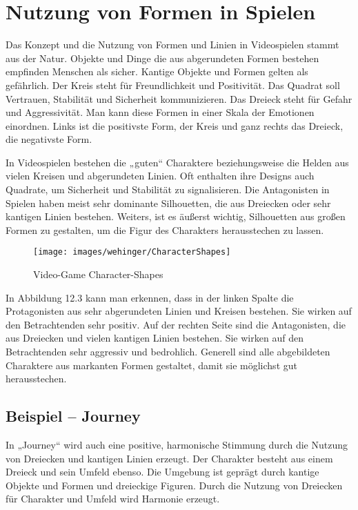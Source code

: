 \section{Nutzung von Formen in Spielen}
Das Konzept und die Nutzung von Formen und Linien in Videospielen stammt aus der Natur. Objekte und Dinge die aus abgerundeten Formen bestehen empfinden Menschen als sicher. Kantige Objekte und Formen gelten als gefährlich. Der Kreis steht für Freundlichkeit und Positivität. Das Quadrat soll Vertrauen, Stabilität und Sicherheit kommunizieren. Das Dreieck steht für Gefahr und Aggressivität. Man kann diese Formen in einer Skala der Emotionen einordnen. Links ist die positivste Form, der Kreis und ganz rechts das Dreieck, die negativste Form. 
\cite{_drawing_basics_and_video_game_art}

In Videospielen bestehen die „guten“ Charaktere beziehungsweise die Helden aus vielen Kreisen und abgerundeten Linien. Oft enthalten ihre Designs auch Quadrate, um Sicherheit und Stabilität zu signalisieren. Die Antagonisten in Spielen haben meist sehr dominante Silhouetten, die aus Dreiecken oder sehr kantigen Linien bestehen. Weiters, ist es äußerst wichtig, Silhouetten aus großen Formen zu gestalten, um die Figur des Charakters herausstechen zu lassen.
\cite{_drawing_basics_and_video_game_art}

\begin{figure}[H]
	\centering
	\texttt{[image: images/wehinger/CharacterShapes]}
	\caption{Video-Game Character-Shapes\cite{_drawing_basics_and_video_game_art}}
\end{figure}

In Abbildung 12.3 kann man erkennen, dass in der linken Spalte die Protagonisten aus sehr abgerundeten Linien und Kreisen bestehen. Sie wirken auf den Betrachtenden sehr positiv. Auf der rechten Seite sind die Antagonisten, die aus Dreiecken und vielen kantigen Linien bestehen. Sie wirken auf den Betrachtenden sehr aggressiv und bedrohlich. Generell sind alle abgebildeten Charaktere aus markanten Formen gestaltet, damit sie möglichst gut herausstechen. 
\cite{_drawing_basics_and_video_game_art}

\subsection{Beispiel – Journey}
In „Journey“ wird auch eine positive, harmonische Stimmung durch die Nutzung von Dreiecken und kantigen Linien erzeugt. Der Charakter besteht aus einem Dreieck und sein Umfeld ebenso. Die Umgebung ist geprägt durch kantige Objekte und Formen und dreieckige Figuren. Durch die Nutzung von Dreiecken für Charakter und Umfeld wird Harmonie erzeugt. 
\cite{_drawing_basics_and_video_game_art}
\cite{_farbkontraste_im_gaming}

